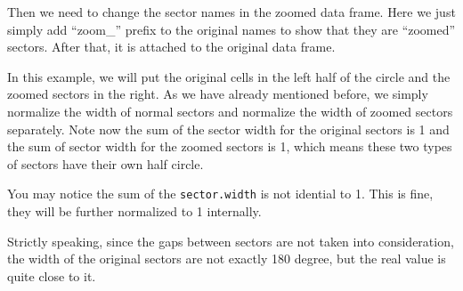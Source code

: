 \documentclass[]{book}
\newenvironment{Shaded}{\begin{snugshade}}{\end{snugshade}}
\newcommand{\KeywordTok}[1]{\textcolor[rgb]{0.13,0.29,0.53}{\textbf{#1}}}
\newcommand{\StringTok}[1]{\textcolor[rgb]{0.31,0.60,0.02}{#1}}
\newcommand{\ControlFlowTok}[1]{\textcolor[rgb]{0.13,0.29,0.53}{\textbf{#1}}}
\newcommand{\OperatorTok}[1]{\textcolor[rgb]{0.81,0.36,0.00}{\textbf{#1}}}
\newcommand{\NormalTok}[1]{#1}
\theoremstyle{definition}
\theoremstyle{definition}
\theoremstyle{remark}
\begin{document}
Then we need to change the sector names in the zoomed data frame. Here
we just simply add ``zoom\_'' prefix to the original names to show that
they are ``zoomed'' sectors. After that, it is attached to the original
data frame.

\begin{Shaded}
\end{Shaded}

In this example, we will put the original cells in the left half of the
circle and the zoomed sectors in the right. As we have already mentioned
before, we simply normalize the width of normal sectors and normalize
the width of zoomed sectors separately. Note now the sum of the sector
width for the original sectors is 1 and the sum of sector width for the
zoomed sectors is 1, which means these two types of sectors have their
own half circle.

You may notice the sum of the \texttt{sector.width} is not idential to
1. This is fine, they will be further normalized to 1 internally.

Strictly speaking, since the gaps between sectors are not taken into
consideration, the width of the original sectors are not exactly 180
degree, but the real value is quite close to it.

\begin{Shaded}
\end{Shaded}
\end{document}
